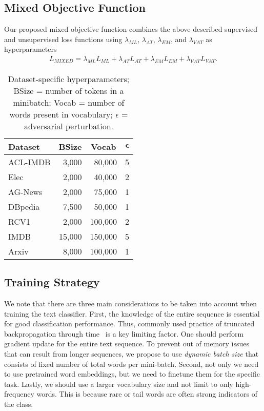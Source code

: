 \documentclass[letterpaper]{article}
\newcommand{\citep}{\cite}
\begin{document}
\subsection{Mixed Objective Function}
Our proposed mixed objective function combines the above described supervised and unsupervised loss functions using $\lambda_{\textit{ML}}$, $\lambda_{\textit{AT}}$, $\lambda_{\textit{EM}}$, and $\lambda_{\textit{VAT}}$ as hyperparameters
\begin{align*}
L_{\textit{MIXED}} = \lambda_{\textit{ML}} L_{\textit{ML}} + \lambda_{\textit{AT}}L_{\textit{AT}} + \lambda_{\textit{EM}}L_{\textit{EM}} + \lambda_{\textit{VAT}} L_{\textit{VAT}}.
\end{align*}

\begin{table}[b]
\small
\centering
\begin{tabular}{@{}l | r r r@{}}
 \toprule
 \textbf{Dataset} & \multicolumn{1}{c}{\textbf{BSize}} & \multicolumn{1}{c}{\textbf{Vocab}} & $\boldsymbol{\epsilon}$ \\
 \midrule
 ACL-IMDB & 3,000 & 80,000 & 5 \\
 Elec & 2,000 & 40,000 & 2 \\
 AG-News & 2,000 & 75,000 & 1 \\
 DBpedia & 7,500 & 50,000 & 1 \\
 RCV1 & 2,000 & 100,000 & 2 \\
 IMDB & 15,000 & 150,000 & 5 \\
 Arxiv & 8,000 & 100,000 & 1 \\
 \bottomrule
 \end{tabular}
\caption{Dataset-specific hyperparameters; BSize = number of tokens in a minibatch; Vocab = number of words present in vocabulary; $\epsilon$ = adversarial perturbation.}
\label{table:hyperparameters}
\end{table}

\subsection{Training Strategy}
We note that there are three main considerations to be taken into account when training the text classifier.
First, the knowledge of the entire sequence is essential for good classification performance. Thus, commonly used practice of truncated backpropagation through time~\citep{werbos1988generalization} is a key limiting factor. One should perform gradient update for the entire text sequence. To prevent out of memory issues that can result from longer sequences, we propose to use \emph{dynamic batch size} that consists of fixed number of total words per mini-batch. Second, not only we need to use pretrained word embeddings, but we need to finetune them for the specific task. Lastly, we should use a larger vocabulary size and not limit to only high-frequency words. This is because rare or tail words are often strong indicators of the class.
\end{document}
